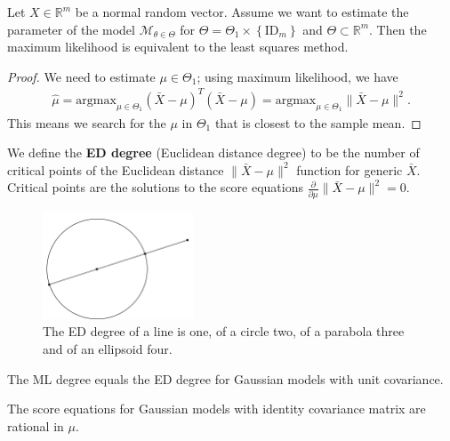 \begin{mdframed}
\begin{prop}
Let \( X \in \mathbb R^m \) be a normal random vector. Assume we want to estimate the parameter of the model \( \mathcal{M}_{\theta \in \Theta} \) for \( \Theta = \Theta_1 \times \left\{ \mathrm{ID}_m \right\} \) and \( \Theta \subset \mathbb R^m \). Then the maximum likelihood is equivalent to the least squares method.
\end{prop}
\end{mdframed}

\begin{proof}
  We need to estimate \( \mu \in \Theta_1 \); using maximum likelihood, we have
  \begin{align*}
    \hat \mu = \mathrm{argmax}_{\mu \in \Theta_1} (\bar X - \mu)^T (\bar X - \mu) =  \mathrm{argmax}_{\mu \in \Theta_1} \lVert \bar X - \mu \rVert^2.
  \end{align*}
  This means we search for the \( \mu \) in \( \Theta_1 \) that is closest to the sample mean.
\end{proof}

We define the \textbf{ED degree} (Euclidean distance degree) to be the number of critical points of the Euclidean distance \( \lVert \bar X - \mu \rVert^2 \) function for generic \( \bar X \). Critical points are the solutions to the score equations \( \frac{\partial}{\partial \mu} \lVert \bar X - \mu \rVert^2 = 0 \). 

\begin{figure}[H]
  \centering
  \includegraphics[width=0.4\textwidth]{assets/eddegree-circle.png}
  \caption{The ED degree of a line is one, of a circle two, of a parabola three and of an ellipsoid four.}
\end{figure}

\begin{cor}
  The ML degree equals the ED degree for Gaussian models with unit covariance.
\end{cor}

\begin{cor}
  The score equations for Gaussian models with identity covariance matrix are rational in \( \mu \).
\end{cor}

